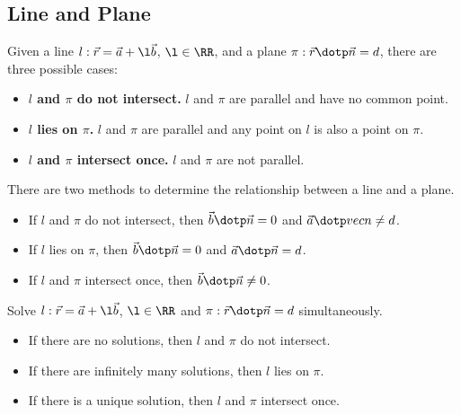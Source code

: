 \subsection{Line and Plane}

\begin{fact}
    Given a line $l : \vec r = \vec a + \l \vec b$, $\l \in \RR$, and a plane $\pi : \vec r \dotp \vec n = d$, there are three possible cases:
    \begin{itemize}
        \item \textbf{$l$ and $\pi$ do not intersect.} $l$ and $\pi$ are parallel and have no common point.
        \item \textbf{$l$ lies on $\pi$.} $l$ and $\pi$ are parallel and any point on $l$ is also a point on $\pi$.
        \item \textbf{$l$ and $\pi$ intersect once.} $l$ and $\pi$ are not parallel.
    \end{itemize}
\end{fact}

There are two methods to determine the relationship between a line and a plane.

\begin{method}
    \phantom{.}
    \begin{itemize}
        \item If $l$ and $\pi$ do not intersect, then $\vec b \dotp \vec n = 0$ and $\vec a \dotp vec n \neq d$.
        \item If $l$ lies on $\pi$, then $\vec b \dotp \vec n = 0$ and $\vec a \dotp \vec n =  d$.
        \item If $l$ and $\pi$ intersect once, then $\vec b \dotp \vec n \neq 0$.
    \end{itemize}
\end{method}

\begin{method}
    Solve $l : \vec r = \vec a + \l \vec b$, $\l \in \RR$ and $\pi : \vec r \dotp \vec n = d$ simultaneously.
    \begin{itemize}
        \item If there are no solutions, then $l$ and $\pi$ do not intersect.
        \item If there are infinitely many solutions, then $l$ lies on $\pi$.
        \item If there is a unique solution, then $l$ and $\pi$ intersect once.
    \end{itemize}
\end{method}

